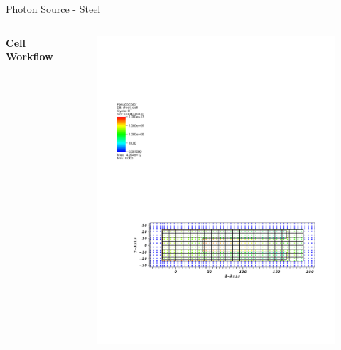 \documentclass{beamer}
\begin{document}
\begin{frame}{Photon Source - Steel}
\begin{columns}[T]
        \textbf{Cell Workflow}
        \begin{figure}
                \centering
                \includegraphics[scale=0.49,trim={2.5cm 6cm 1cm 16cm},clip]{figs/src_steel_cell.pdf}
        \end{figure}




\end{columns}
\end{frame}
\end{document}

